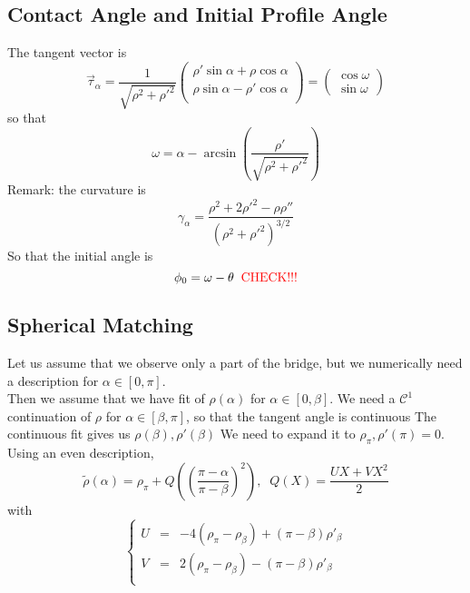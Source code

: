 \documentclass[aps,onecolumn]{revtex4}
\begin{document}
\subsection{Contact Angle and Initial Profile Angle}
The   tangent vector is
\begin{equation}
	\vec{\tau}_\alpha = 
	\dfrac{1}{\sqrt{\rho^2+\rho'^2}}
	\begin{pmatrix}
		\rho'\sin\alpha+\rho\cos\alpha\\
		\rho\sin\alpha - \rho'\cos\alpha\\
	\end{pmatrix}
 = 
 	\begin{pmatrix}
	\cos\omega\\
	\sin\omega
	\end{pmatrix}
\end{equation}
so that
\begin{equation}
	\omega = \alpha - \arcsin\left(\dfrac{\rho'}{\sqrt{\rho^2+\rho'^2}}\right)
\end{equation}
Remark: the curvature is
\begin{equation}
	\gamma_\alpha = \dfrac{\rho^2 + 2\rho'^2 - \rho\rho''}{\left(\rho^2+\rho'^2\right)^{3/2}}
\end{equation}
So that the initial angle is
\begin{equation}
	\phi_0 = \omega - \theta \;\; \text{\textcolor{red}{CHECK!!!}}
\end{equation}


\subsection{Spherical Matching}
Let us assume that we observe only a part of the bridge, but we numerically need
a description for $\alpha\in[0,\pi]$.\\

Then we assume that we have fit of $\rho(\alpha)$ for $\alpha\in[0,\beta]$.
We need a $\mathcal{C}^1$ continuation of $\rho$ for $\alpha\in[\beta,\pi]$, so
that the tangent angle is continuous
The continuous fit gives us $\rho(\beta),\rho'(\beta)$
We need to expand it to $\rho_\pi,\rho'(\pi)=0$.
Using an even description,
\begin{equation}
	\tilde{\rho}(\alpha) = \rho_\pi + Q\left( \left(\dfrac{\pi-\alpha}{\pi-\beta}\right)^2 \right)
	, \;\; Q(X) = \dfrac{UX+VX^2}{2}
\end{equation}
with
\begin{equation}
\left\lbrace
	\begin{array}{rcl}
	U & = & -4\left(\rho_\pi-\rho_\beta\right)+\left(\pi-\beta\right) \rho'_\beta\\
	V & = & 2\left(\rho_\pi-\rho_\beta\right)-\left(\pi-\beta\right) \rho'_\beta \\
	\end{array}
\right.
\end{equation}
\end{document}
